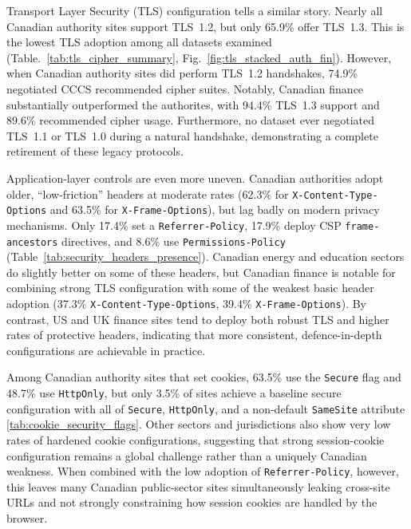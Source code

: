 \documentclass[pdflatex,sn-mathphys-num]{sn-jnl}
\numberwithin{equation}{section}
\theoremstyle{thmstyleone}
\theoremstyle{thmstyletwo}%
\theoremstyle{thmstylethree}%
\begin{document}
\vspace{1em}Transport Layer Security (TLS) configuration tells a similar story. Nearly all Canadian authority 
sites support TLS~1.2, but only 65.9\% offer TLS~1.3. This is the lowest TLS adoption among all datasets
examined (Table.~\ref{tab:tls_cipher_summary}, Fig.~\ref{fig:tls_stacked_auth_fin}). However,
when Canadian authority sites did perform TLS~1.2 handshakes, 74.9\% negotiated CCCS recommended cipher suites.
Notably, Canadian finance substantially outperformed
the authorites, with 94.4\% TLS~1.3 support and 89.6\% recommended cipher usage. Furthermore, no dataset ever negotiated
TLS~1.1 or TLS~1.0 during a natural handshake, demonstrating a complete retirement of these legacy protocols. 

\vspace{1em}Application-layer controls are even more uneven. Canadian authorities adopt older, ``low-friction'' 
headers at moderate rates (62.3\% for \texttt{X-Content-Type-Options} and 63.5\% for \texttt{X-Frame-Options}), 
but lag badly on modern privacy mechanisms. Only 17.4\% set a 
\texttt{Referrer-Policy}, 17.9\% deploy CSP \texttt{frame-ancestors} directives, and 8.6\% use 
\texttt{Permissions-Policy} (Table~\ref{tab:security_headers_presence}). Canadian energy and education sectors do slightly better on some of these headers, 
but Canadian finance is notable for combining strong TLS configuration with some of the weakest basic header 
adoption (37.3\% \texttt{X-Content-Type-Options}, 39.4\% \texttt{X-Frame-Options}). By contrast, US and UK 
finance sites tend to deploy both robust TLS and higher rates of protective headers, indicating that more 
consistent, defence-in-depth configurations are achievable in practice.

\vspace{1em}Among Canadian authority sites that set 
cookies, 63.5\% use the \texttt{Secure} flag and 48.7\% use \texttt{HttpOnly}, but only 3.5\% of sites achieve 
a baseline secure configuration with all of \texttt{Secure}, \texttt{HttpOnly}, and a non-default 
\texttt{SameSite} attribute \ref{tab:cookie_security_flags}. Other sectors and jurisdictions also show very 
low rates of hardened cookie 
configurations, suggesting that strong session-cookie configuration remains a global challenge rather than a uniquely 
Canadian weakness. When combined with the low adoption of \texttt{Referrer-Policy}, however, this leaves many 
Canadian public-sector sites simultaneously leaking cross-site URLs and not strongly constraining how session 
cookies are handled by the browser.
\end{document}
